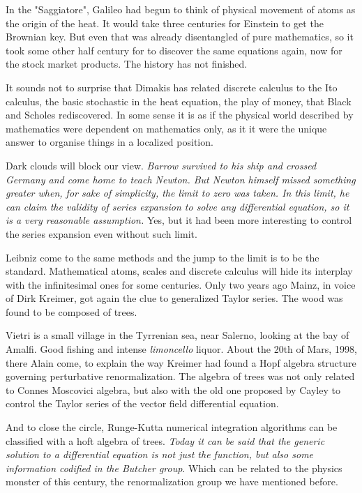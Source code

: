 \documentclass[a4paper,10pt]{article}
\begin{document}
In the "Saggiatore", Galileo
had begun to think of physical movement of atoms as the origin of the
heat. It would take three centuries for Einstein to get the Brownian
key. But even that was already disentangled of pure mathematics, so
it took some other half century for to discover the same equations
again, now for the stock market products. The history has not finished.

It sounds not to surprise that Dimakis has related discrete calculus
to the Ito calculus, the basic stochastic in the heat equation, the
play of money, that Black and Scholes rediscovered. In some sense
it is as if the physical world described by mathematics were dependent
on mathematics only, as it it were the unique answer to organise
things in a localized position. 

Dark clouds will block our view. {\it Barrow survived to his ship and
crossed Germany and come home to teach Newton.
But Newton himself missed
something greater when, for sake
of simplicity, the limit to zero was taken. In this limit, he can
claim the validity of series expansion to solve any differential
equation, so it is a very reasonable assumption. } Yes, but it had been
more interesting to control the series expansion even without such
limit. 


Leibniz come to the same methods and the jump to the limit is
to be the standard. Mathematical atoms, scales and
discrete calculus will hide its interplay with the infinitesimal
ones for some centuries. Only two years ago Mainz, in voice of
Dirk Kreimer, got again the clue to generalized Taylor series. The
wood was found to be composed of trees.

Vietri is a small village in the Tyrrenian sea, near Salerno, looking at
the bay of Amalfi. Good fishing and intense {\it limoncello} liquor. About
the 20th of Mars, 1998, there Alain come, to explain the way Kreimer had 
found a Hopf algebra structure governing perturbative renormalization.
The algebra of trees was not only related to Connes Moscovici algebra,
but also with the old one proposed by Cayley to control the Taylor
series of the vector field differential equation.

And to close the circle, Runge-Kutta numerical integration algorithms 
can be
classified with a hoft algebra of trees. {\it Today it can 
be said\cite{lessons} that
the generic solution to a differential equation is not just the
function, but also some information codified in the Butcher
group}. Which can be related to the physics monster of this century, 
the renormalization group we have mentioned before. 
\end{document}
